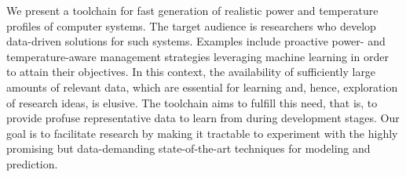 We present a toolchain for fast generation of realistic power and temperature
profiles of computer systems. The target audience is researchers who develop
data-driven solutions for such systems. Examples include proactive \mbox{power-}
and temperature-aware management strategies leveraging machine learning in order
to attain their objectives. In this context, the availability of sufficiently
large amounts of relevant data, which are essential for learning and, hence,
exploration of research ideas, is elusive. The toolchain aims to fulfill this
need, that is, to provide profuse representative data to learn from during
development stages. Our goal is to facilitate research by making it tractable to
experiment with the highly promising but data-demanding state-of-the-art
techniques for modeling and prediction.
